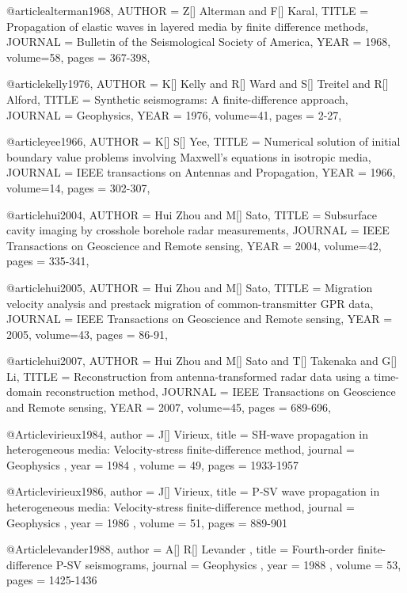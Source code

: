 {@article{alterman1968,
  AUTHOR =       {Z[] Alterman and F[] Karal},
  TITLE =        {Propagation of elastic waves in layered media by finite difference methods},
  JOURNAL =      {Bulletin of the Seismological Society of America},
  YEAR =         {1968},
  volume=58,
  pages = {367-398},
}

@article{kelly1976,
  AUTHOR =       {K[] Kelly and R[] Ward and S[] Treitel and R[] Alford},
  TITLE =        {Synthetic seismograms: A finite-difference approach},
  JOURNAL =      {Geophysics},
  YEAR =         {1976},
  volume=41,
  pages = {2-27},
}

@article{yee1966,
  AUTHOR =       {K[] S[] Yee},
  TITLE =        {Numerical solution of initial boundary value problems involving Maxwell's equations in isotropic media},
  JOURNAL =      {IEEE transactions on Antennas and Propagation},
  YEAR =         {1966},
  volume=14,
  pages = {302-307},
}

@article{hui2004,
  AUTHOR =       {Hui Zhou and M[] Sato},
  TITLE =        {Subsurface cavity imaging by crosshole borehole radar measurements},
  JOURNAL =      {IEEE Transactions on Geoscience and Remote sensing},
  YEAR =         {2004},
  volume=42,
  pages = {335-341},
}

@article{hui2005,
  AUTHOR =       {Hui Zhou and M[] Sato},
  TITLE =        {Migration velocity analysis and prestack migration of common-transmitter GPR data},
  JOURNAL =      {IEEE Transactions on Geoscience and Remote sensing},
  YEAR =         {2005},
  volume=43,
  pages = {86-91},
}

@article{hui2007,
  AUTHOR =       {Hui Zhou and M[] Sato and T[] Takenaka and G[] Li},
  TITLE =        {Reconstruction from antenna-transformed radar data using a time-domain reconstruction method},
  JOURNAL =      {IEEE Transactions on Geoscience and Remote sensing},
  YEAR =         {2007},
  volume=45,
  pages = {689-696},
}

@Article{virieux1984,
 author =  { J[] Virieux},
 title =   { SH-wave propagation in heterogeneous media: Velocity-stress finite-difference method},
 journal = { Geophysics },
 year =    { 1984 },
 volume =  { 49},
 pages =   { 1933-1957 }
}

@Article{virieux1986,
 author =  { J[] Virieux},
 title =   { P-SV wave propagation in heterogeneous media: Velocity-stress finite-difference method},
 journal = { Geophysics },
 year =    { 1986 },
 volume =  { 51},
 pages =   { 889-901 }
}

@Article{levander1988,
 author =  { A[] R[] Levander },
 title =   { Fourth-order finite-difference P-SV seismograms},
 journal = { Geophysics },
 year =    { 1988 },
 volume =  { 53},
 pages =   { 1425-1436 }
}

}
